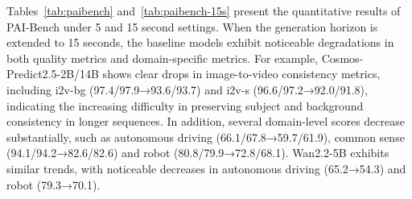 \begin{table}[ht]
\centering
\caption{Evaluation on PAI-bench-\textbf{15s}. For each column, the highest score is \textbf{bolded}. }
\label{tab:paibench-15s}
\end{table}




Tables~\ref{tab:paibench} and~\ref{tab:paibench-15s} present the quantitative results of PAI-Bench under 5 and 15 second settings. When the generation horizon is extended to 15 seconds, the baseline models exhibit noticeable degradations in both quality metrics and domain-specific metrics. For example, Cosmos-Predict2.5-2B/14B shows clear drops in image-to-video consistency metrics, including i2v-bg (97.4/97.9→93.6/93.7) and i2v-s (96.6/97.2→92.0/91.8), indicating the increasing difficulty in preserving subject and background consistency in longer sequences. In addition, several domain-level scores decrease substantially, such as autonomous driving (66.1/67.8→59.7/61.9), common sense (94.1/94.2→82.6/82.6) and robot (80.8/79.9→72.8/68.1). Wan2.2-5B exhibits similar trends, with noticeable decreases in autonomous driving (65.2→54.3) and robot (79.3→70.1).

